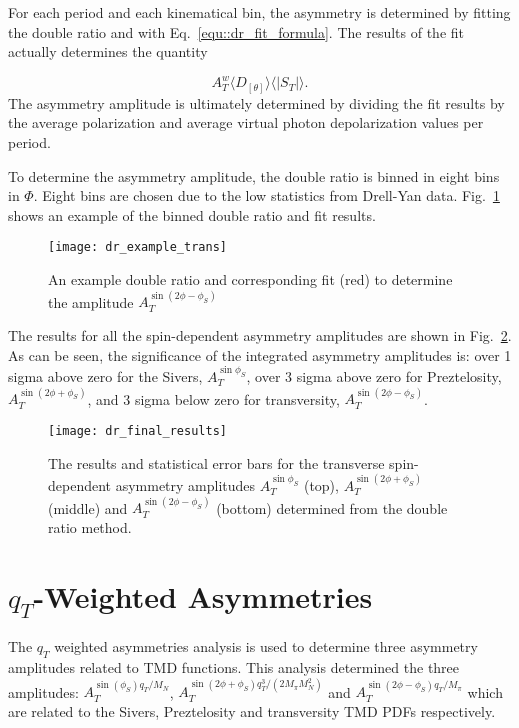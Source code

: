 For each period and each kinematical bin, the asymmetry is determined by fitting
the double ratio and with Eq.~\ref{equ::dr_fit_formula}.  The results of the fit
actually determines the quantity

\begin{equation}
  A^w_T \langle D_{[\theta]} \rangle \langle |S_T|\rangle.
\end{equation}
\noindent
The asymmetry amplitude is ultimately determined by dividing the fit results by
the average polarization and average virtual photon depolarization values per
period.

To determine the asymmetry amplitude, the double ratio is binned in eight bins
in $\Phi$.  Eight bins are chosen due to the low statistics from Drell-Yan data.
Fig.~\ref{fig::dr_example_trans} shows an example of the binned double ratio and
fit results.

\begin{figure}[h!t]
  \centering \texttt{[image: dr\_example\_trans]}
  \caption{An example double ratio and corresponding fit (red) to determine the
    amplitude $A_T^{\sin(2\phi-\phi_S)}$}
  \label{fig::dr_example_trans}
\end{figure}

\noindent
The results for all the spin-dependent asymmetry amplitudes are shown in
Fig.~\ref{fig::dr_final_results}.  As can be seen, the significance of the
integrated asymmetry amplitudes is: over 1 sigma above zero for the Sivers,
$A^{\sin\phi_S}_T$, over 3 sigma above zero for Preztelosity,
$A^{\sin(2\phi+\phi_S)}_T$, and 3 sigma below zero for transversity,
$A^{\sin(2\phi-\phi_S)}_T$.

\begin{figure}[h!t]
  \centering \texttt{[image: dr\_final\_results]}
  \caption{The results and statistical error bars for the transverse
    spin-dependent asymmetry amplitudes $A^{\sin\phi_S}_T$ (top),
    $A^{\sin(2\phi+\phi_S)}_T$ (middle) and $A^{\sin(2\phi-\phi_S)}_T$ (bottom)
    determined from the double ratio method.}
  \label{fig::dr_final_results}
\end{figure}


\section{$q_T$-Weighted Asymmetries} \label{sec::qtweighted}
The $q_T$ weighted asymmetries analysis is used to determine three asymmetry
amplitudes related to TMD functions.  This analysis determined the three
amplitudes: $A_T^{\sin(\phi_S) q_T/M_N}$, $A_T^{\sin(2\phi+\phi_S)
  q^3_T/(2M_{\pi}M_N^2)}$ and $A_T^{\sin(2\phi-\phi_S) q_T/M_{\pi}}$ which are
related to the Sivers, Preztelosity and transversity TMD PDFs respectively.


